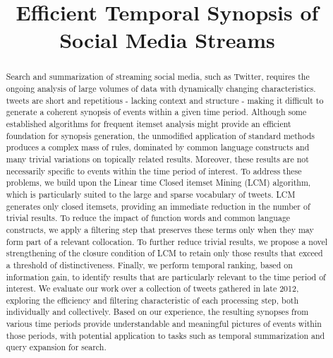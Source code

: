 \documentclass{sig-alternate}
\begin{document}
\title{Efficient Temporal Synopsis of Social Media Streams}

\maketitle
\begin{abstract}
Search and summarization of streaming social media, such as Twitter, requires the ongoing analysis of large volumes of data with dynamically changing characteristics.  tweets are short and repetitious - lacking context and structure  - making it difficult to generate a coherent synopsis of events within a given time period.  Although some established algorithms for frequent itemset analysis might provide an efficient foundation for synopsis generation, the unmodified application of standard methods produces a complex mass of rules, dominated by common language constructs and many trivial variations on topically related results.  Moreover, these results are not necessarily specific to events within the time period of interest.  To address these problems, we build upon the Linear time Closed itemset Mining (LCM) algorithm, which is particularly suited to the large and sparse vocabulary of tweets.  LCM generates only closed itemsets, providing an immediate reduction in the number of trivial results.  To reduce the impact of function words and common language constructs, we apply a filtering step that preserves these terms only when they may form part of a relevant collocation.  To further reduce trivial results, we propose a novel strengthening of the closure condition of LCM to retain only those results that exceed a threshold of distinctiveness.  Finally, we perform temporal ranking, based on information gain, to identify results that are particularly relevant to the time period of interest.  We evaluate our work over a collection of tweets gathered in late 2012, exploring the efficiency and filtering characteristic of each processing step, both individually and collectively.  Based on our experience, the resulting synopses from various time periods provide understandable and meaningful pictures of events within those periods, with potential application to tasks such as temporal summarization and query expansion for search.
\end{abstract}
\end{document}
